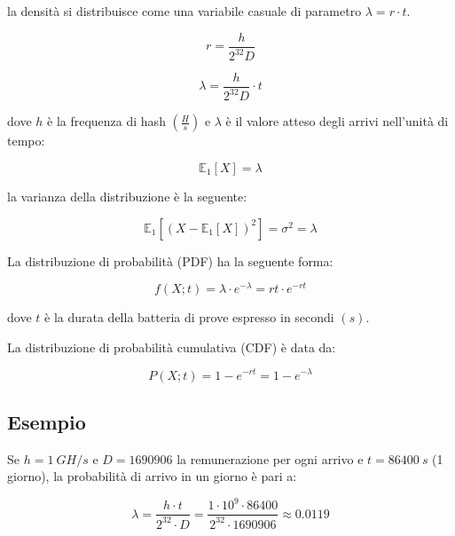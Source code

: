 \documentclass{book}
\theoremstyle{definition}
\begin{document}
la densità si distribuisce come una variabile casuale di parametro $\lambda = r \cdot t$.

\begin{equation}
    r = \frac{h}{2^{32}D} \label{rate}
\end{equation}

\begin{equation}
    \lambda = \frac{h}{2^{32}D} \cdot t \label{lambda}
\end{equation}

dove $h$ è la frequenza di hash $(\frac{H}{s})$ e $\lambda$ è il valore atteso degli arrivi nell'unità di tempo:

\begin{equation}
    \mathbb{E}_{1}[X] = \lambda \label{E_lambda}
\end{equation}

la varianza della distribuzione è la seguente:

\begin{equation}
    \mathbb{E}_{1}[ ( X - \mathbb{E}_{1}[X] )^2 ] = \sigma^{2} = \lambda \label{sigma2_lambda}
\end{equation}

La distribuzione di probabilità (PDF) ha la seguente forma:

\begin{equation}
    f(X; t) = \lambda \cdot e^{-\lambda} = rt \cdot e^{-rt}
\end{equation}

dove $t$ è la durata della batteria di prove espresso in  secondi $(s)$.

La distribuzione di probabilità cumulativa (CDF) è data da:

\begin{equation}
    P(X; t) = 1 - e^{-rt} = 1 - e^{-\lambda} \label{eq:CDF}
\end{equation}

\subsection{Esempio}

Se $h = 1 \ GH/s$ e $D = 1690906$ la remunerazione per ogni arrivo e $t = 86400 \ s$ (1 giorno), la probabilità di arrivo in un giorno è pari a:

\begin{equation}
    \lambda = \frac{h \cdot t}{2^{32} \cdot D} = \frac{1 \cdot 10^{9} \cdot 86400}{2^{32} \cdot 1690906} \approx 0.0119
\end{equation}
\end{document}
